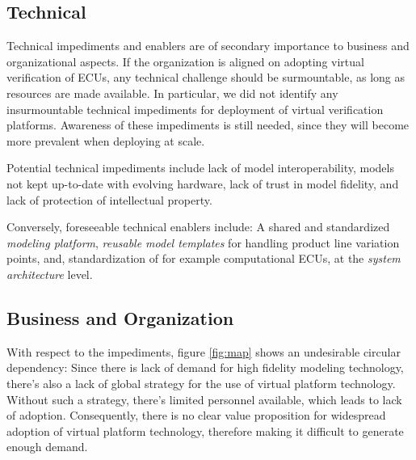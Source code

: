 \subsection{Technical}
Technical impediments and enablers are of secondary importance to business and organizational aspects.
If the organization is aligned on adopting virtual verification of ECUs,
any technical challenge should be surmountable, as long as resources are made available.
In particular, we did not identify any insurmountable technical impediments for deployment of virtual verification platforms.
Awareness of these impediments is still needed, since they will become more prevalent when deploying at scale.

Potential technical impediments include
lack of model interoperability,
models not kept up-to-date with evolving hardware,
lack of trust in model fidelity,
and lack of protection of intellectual property.

Conversely, foreseeable technical enablers include:
A shared and standardized \emph{modeling platform},
\emph{reusable model templates} for handling product line variation points,
and, standardization of for example computational ECUs, at the \emph{system architecture} level.



\subsection{Business and Organization}
With respect to the impediments, figure \ref{fig:map} shows an undesirable circular dependency:
Since there is lack of demand for high fidelity modeling technology,
there's also a lack of global strategy for the use of virtual platform technology.
Without such a strategy, there's limited personnel available,
which leads to lack of adoption.
Consequently, there is no clear value proposition for widespread adoption of virtual platform technology, therefore making it difficult to generate enough demand.

